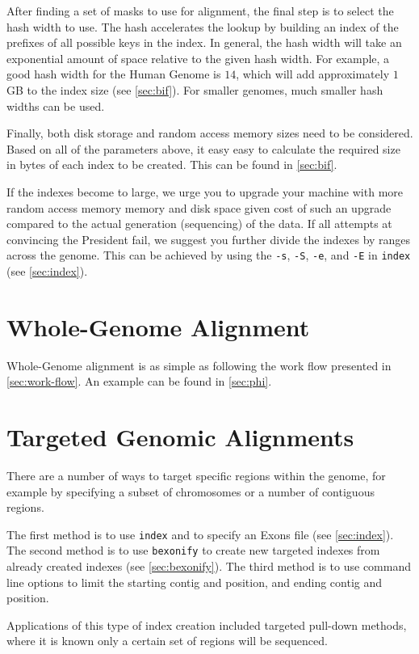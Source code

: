 \documentclass[a4paper,12pt]{book}
\newcommand{\TT}[1]{{\tt #1}} %
\begin{document}
After finding a set of masks to use for alignment, the final step is to select the hash width to use. 
The hash accelerates the lookup by building an index of the prefixes of all possible keys in the index.
In general, the hash width will take an exponential amount of space relative to the given hash width.
For example, a good hash width for the Human Genome is $14$, which will add approximately $1$GB to the index size (see \autoref{sec:bif}).
For smaller genomes, much smaller hash widths can be used.

Finally, both disk storage and random access memory sizes need to be considered.  
Based on all of the parameters above, it easy easy to calculate the required size in bytes of each index to be created.
This can be found in \autoref{sec:bif}.

If the indexes become to large, we urge you to upgrade your machine with more random access memory memory and disk space given cost of such an upgrade compared to the actual generation (sequencing) of the data.
If all attempts at convincing the President fail, we suggest you further divide the indexes by ranges across the genome.
This can be achieved by using the \TT{-s}, \TT{-S}, \TT{-e}, and \TT{-E} in \TT{index} (see \autoref{sec:index}).

\section{Whole-Genome Alignment}
\label{sec:whole-genome-alignment}
Whole-Genome alignment is as simple as following the work flow presented in \autoref{sec:work-flow}.
An example can be found in \autoref{sec:phi}.
\section{Targeted Genomic Alignments}
\label{sec:targeted-genomic-alignments}
There are a number of ways to target specific regions within the genome, for example by specifying a subset of chromosomes or a number of contiguous regions.

The first method is to use \TT{index} and to specify an Exons file (see \autoref{sec:index}).
The second method is to use \TT{bexonify} to create new targeted indexes from already created indexes (see \autoref{sec:bexonify}).
The third method is to use command line options to limit the starting contig and position, and ending contig and position.

Applications of this type of index creation included targeted pull-down methods, where it is known only a certain set of regions will be sequenced.
\end{document}
